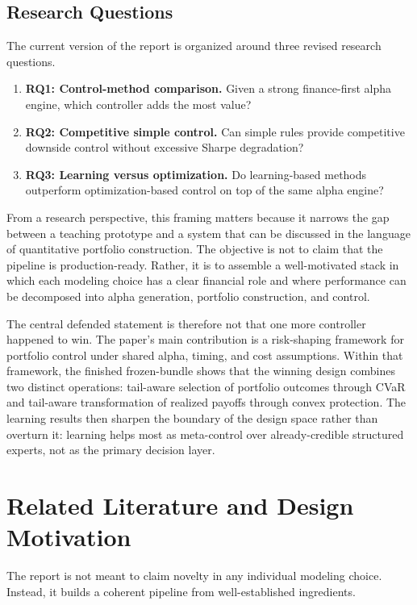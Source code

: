 \documentclass[10pt,twocolumn]{article}
\begin{document}
\subsection{Research Questions}

The current version of the report is organized around three revised research
questions.
\begin{enumerate}[leftmargin=1.5em, itemsep=2pt, topsep=4pt]
\item \textbf{RQ1: Control-method comparison.} Given a strong finance-first
      alpha engine, which controller adds the most value?
\item \textbf{RQ2: Competitive simple control.} Can simple rules provide
      competitive downside control without excessive Sharpe degradation?
\item \textbf{RQ3: Learning versus optimization.} Do learning-based methods
      outperform optimization-based control on top of the same alpha engine?
\end{enumerate}

From a research perspective, this framing matters because it narrows the gap
between a teaching prototype and a system that can be discussed in the language
of quantitative portfolio construction. The objective is not to claim that the
pipeline is production-ready. Rather, it is to assemble a well-motivated stack
in which each modeling choice has a clear financial role and where performance
can be decomposed into alpha generation, portfolio construction, and control.

The central defended statement is therefore not that one more controller happened to win. The paper's main contribution is a risk-shaping framework for portfolio control under shared alpha, timing, and cost assumptions. Within that framework, the finished frozen-bundle shows that the winning design combines two distinct operations: tail-aware selection of portfolio outcomes through CVaR and tail-aware transformation of realized payoffs through convex protection. The learning results then sharpen the boundary of the design space rather than overturn it: learning helps most as meta-control over already-credible structured experts, not as the primary decision layer.

\section{Related Literature and Design Motivation}

The report is not meant to claim novelty in any individual modeling choice.
Instead, it builds a coherent pipeline from well-established ingredients.
\end{document}
